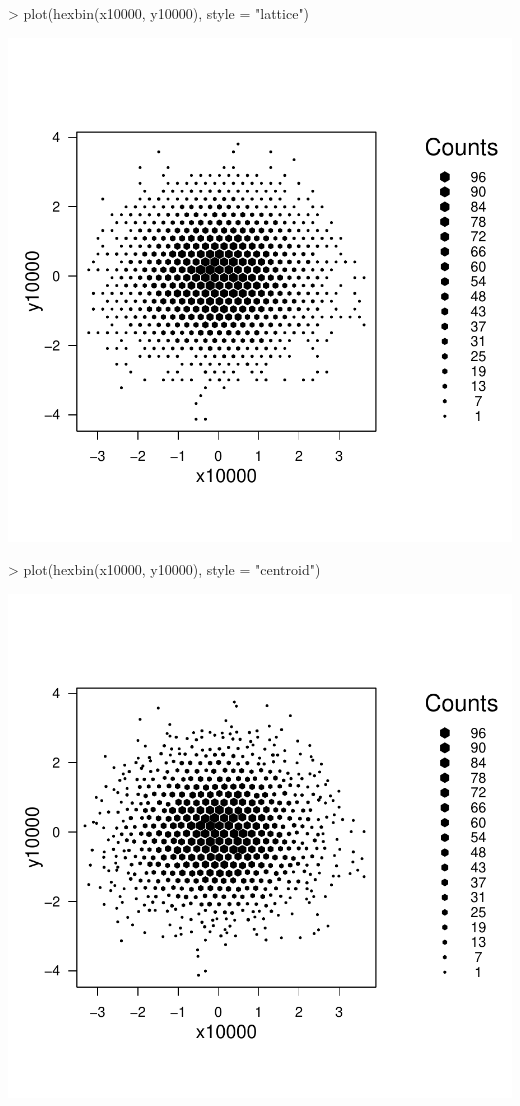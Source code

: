 \documentclass[12pt,letterpaper,final]{article}
\begin{document}
\begin{Schunk}
\begin{Sinput}
> plot(hexbin(x10000, y10000), style = "lattice")
\end{Sinput}
\end{Schunk}
\includegraphics{lect_main-011}

\begin{Schunk}
\begin{Sinput}
> plot(hexbin(x10000, y10000), style = "centroid")
\end{Sinput}
\end{Schunk}
\includegraphics{lect_main-012}
\end{document}
